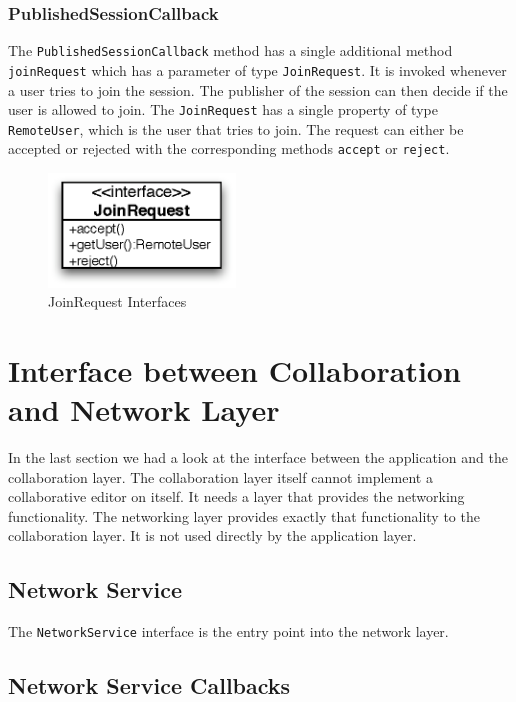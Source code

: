 \subsubsection{PublishedSessionCallback}
The \texttt{PublishedSessionCallback} method has a single additional method
\texttt{joinRequest} which has a parameter of type \texttt{JoinRequest}. It
is invoked whenever a user tries to join the session. The publisher of the
session can then decide if the user is allowed to join. The \texttt{JoinRequest}
has a single property of type \texttt{RemoteUser}, which is the user that 
tries to join. The request can either be accepted or rejected with the 
corresponding methods \texttt{accept} or \texttt{reject}.

\begin{figure}[H]
 \centering
 \includegraphics[width=4.97cm,height=3.03cm]{../images/finalreport/architecture_joinrequest_uml.eps}
 \caption{JoinRequest Interfaces}
\end{figure}



\section{Interface between Collaboration and Network Layer}
In the last section we had a look at the interface between the application and
the collaboration layer. The collaboration layer itself cannot implement a
collaborative editor on itself. It needs a layer that provides the networking
functionality. The networking layer provides exactly that functionality to
the collaboration layer. It is not used directly by the application layer.

\subsection{Network Service}
The \texttt{NetworkService} interface is the entry point into the network layer.


\subsection{Network Service Callbacks}

